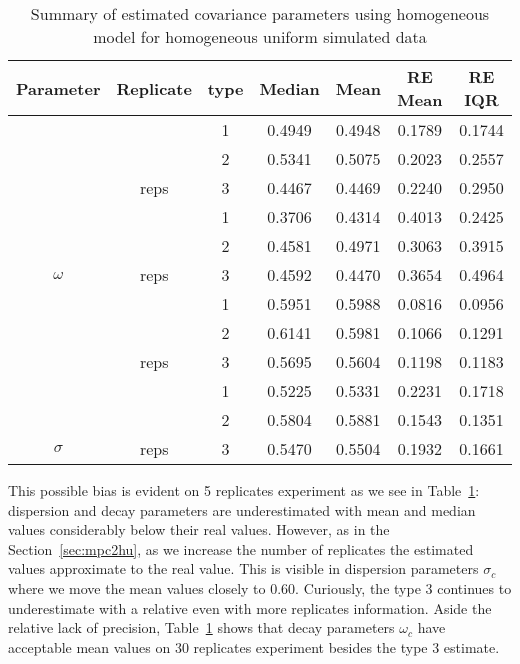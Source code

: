 \begin{table}[b]\centering
\caption{Summary of estimated covariance parameters using homogeneous  model for homogeneous uniform simulated data}
\begin{knitrout}
\color{fgcolor}
\begin{tabular}{ccccccc}
\toprule
Parameter & Replicate & type & Median & Mean & RE Mean & RE IQR\\
\midrule
 &  & 1 & 0.4949 & 0.4948 & 0.1789 & 0.1744\\

 &  & 2 & 0.5341 & 0.5075 & 0.2023 & 0.2557\\

 & \multirow{-3}{*}{\centering\arraybackslash 30 reps} & 3 & 0.4467 & 0.4469 & 0.2240 & 0.2950\\
\cmidrule{2-7}
 &  & 1 & 0.3706 & 0.4314 & 0.4013 & 0.2425\\

 &  & 2 & 0.4581 & 0.4971 & 0.3063 & 0.3915\\

\multirow{-6}{*}{\centering\arraybackslash $\omega$} & \multirow{-3}{*}{\centering\arraybackslash 5 reps} & 3 & 0.4592 & 0.4470 & 0.3654 & 0.4964\\
\cmidrule{1-7}
 &  & 1 & 0.5951 & 0.5988 & 0.0816 & 0.0956\\

 &  & 2 & 0.6141 & 0.5981 & 0.1066 & 0.1291\\

 & \multirow{-3}{*}{\centering\arraybackslash 30 reps} & 3 & 0.5695 & 0.5604 & 0.1198 & 0.1183\\
\cmidrule{2-7}
 &  & 1 & 0.5225 & 0.5331 & 0.2231 & 0.1718\\

 &  & 2 & 0.5804 & 0.5881 & 0.1543 & 0.1351\\

\multirow{-6}{*}{\centering\arraybackslash $\sigma$} & \multirow{-3}{*}{\centering\arraybackslash 5 reps} & 3 & 0.5470 & 0.5504 & 0.1932 & 0.1661\\
\bottomrule
\end{tabular}


\end{knitrout}
\label{tab:par-hu2homog}
\end{table}

This possible bias is evident on 5 replicates experiment as we see in Table~\ref{tab:par-hu2homog}: dispersion and  decay parameters are underestimated with mean and median values considerably below their real values. However, as in the Section~\ref{sec:mpc2hu}, as we increase the number of replicates the estimated values approximate to the real value. This is visible in dispersion parameters $\sigma_c$ where we move the mean values closely to 0.60. Curiously, the type 3 continues to underestimate with a relative even with more replicates information. Aside the relative lack of precision, Table~\ref{tab:par-hu2homog} shows that decay parameters $\omega_c$ have acceptable mean values on 30 replicates experiment besides the type 3 estimate.

